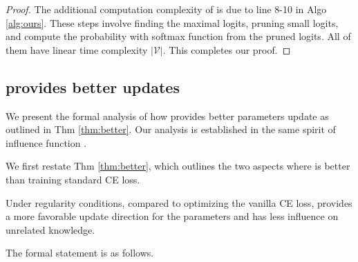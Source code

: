\begin{proof} 
The additional computation complexity of {\NAME} is due to line 8-10 in Algo \ref{alg:ours}. These steps involve finding the maximal logits, pruning small logits, and compute the probability with softmax function from the pruned logits. All of them have linear time complexity $|\mathcal V|$.
This completes our proof. 


\end{proof}








\subsection{{\NAME} provides better updates}
\label{app:proof:better}

We present the formal analysis of how {\NAME} provides better parameters update as outlined in Thm \ref{thm:better}. 
Our analysis is established in the same spirit of influence function \citep{koh2017understanding}. 


We first restate Thm \ref{thm:better}, which outlines the two aspects where {\NAME} is better than training standard CE loss. 

\begin{theorem}[Informal]
Under regularity conditions, compared to optimizing the vanilla CE loss, {\NAME} provides a more favorable update direction for the parameters and has less influence on unrelated knowledge.
\end{theorem}

The formal statement is as follows. 


